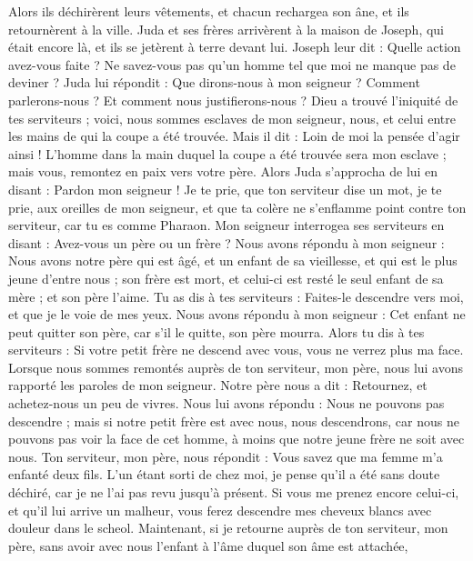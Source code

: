 \begin{multicols}{2}
Alors ils déchirèrent leurs vêtements, et chacun rechargea son âne, et ils retournèrent à la ville.
Juda et ses frères arrivèrent à la maison de Joseph, qui était encore là, et ils se jetèrent à terre devant lui.
Joseph leur dit : Quelle action avez-vous faite ? Ne savez-vous pas qu'un homme tel que moi ne manque pas de deviner ?
Juda lui répondit : Que dirons-nous à mon seigneur ? Comment parlerons-nous ? Et comment nous justifierons-nous ? Dieu a trouvé l'iniquité de tes serviteurs ; voici, nous sommes esclaves de mon seigneur, nous, et celui entre les mains de qui la coupe a été trouvée.
Mais il dit : Loin de moi la pensée d'agir ainsi ! L'homme dans la main duquel la coupe a été trouvée sera mon esclave ; mais vous, remontez en paix vers votre père.
Alors Juda s'approcha de lui en disant : Pardon mon seigneur ! Je te prie, que ton serviteur dise un mot, je te prie, aux oreilles de mon seigneur, et que ta colère ne s'enflamme point contre ton serviteur, car tu es comme Pharaon.
Mon seigneur interrogea ses serviteurs en disant : Avez-vous un père ou un frère ?
Nous avons répondu à mon seigneur : Nous avons notre père qui est âgé, et un enfant de sa vieillesse, et qui est le plus jeune d'entre nous ; son frère est mort, et celui-ci est resté le seul enfant de sa mère ; et son père l'aime.
Tu as dis à tes serviteurs : Faites-le descendre vers moi, et que je le voie de mes yeux.
Nous avons répondu à mon seigneur : Cet enfant ne peut quitter son père, car s'il le quitte, son père mourra.
Alors tu dis à tes serviteurs : Si votre petit frère ne descend avec vous, vous ne verrez plus ma face.
Lorsque nous sommes remontés auprès de ton serviteur, mon père, nous lui avons rapporté les paroles de mon seigneur.
Notre père nous a dit : Retournez, et achetez-nous un peu de vivres.
Nous lui avons répondu : Nous ne pouvons pas descendre ; mais si notre petit frère est avec nous, nous descendrons, car nous ne pouvons pas voir la face de cet homme, à moins que notre jeune frère ne soit avec nous.
Ton serviteur, mon père, nous répondit : Vous savez que ma femme m'a enfanté deux fils.
L'un étant sorti de chez moi, je pense qu'il a été sans doute déchiré, car je ne l'ai pas revu jusqu'à présent.
Si vous me prenez encore celui-ci, et qu'il lui arrive un malheur, vous ferez descendre mes cheveux blancs avec douleur dans le scheol.
Maintenant, si je retourne auprès de ton serviteur, mon père, sans avoir avec nous l'enfant à l'âme duquel son âme est attachée,

\end{multicols}
